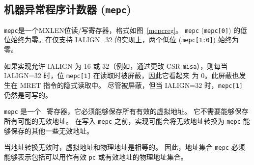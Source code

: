\subsection{机器异常程序计数器 ({\tt mepc})}

\iffalse
{\tt mepc} is an MXLEN-bit read/write register formatted as shown in
Figure~\ref{mepcreg}.  The low bit of {\tt mepc} ({\tt mepc[0]}) is
always zero.  On implementations that support only IALIGN=32, the two low bits
({\tt mepc[1:0]}) are always zero.

If an implementation allows IALIGN to be either 16 or 32 (by
changing CSR {\tt misa}, for example), then, whenever IALIGN=32, bit
{\tt mepc[1]} is masked on reads so that it appears to be 0.  This
masking occurs also for the implicit read by the MRET instruction.
Though masked, {\tt mepc[1]} remains writable when IALIGN=32.

{\tt mepc} is a \warl\ register that must be able to hold all valid
virtual addresses.  It need not be capable of holding all possible invalid
addresses.
Prior to writing {\tt mepc}, implementations may convert an invalid address
into some other invalid address that {\tt mepc} is capable of holding.
\fi

{\tt mepc}是一个MXLEN位读/写寄存器，格式如图~\ref{mepcreg}。 {\tt mepc} ({\tt mepc[0]}) 的低位始终为零。在仅支持 IALIGN=32 的实现上，两个低位 ({\tt mepc[1:0]}) 始终为零。

如果实现允许 IALIGN 为 16 或 32（例如，通过更改 CSR {\tt misa}），则每当 IALIGN=32 时，位 {\tt mepc[1]} 在读取时被屏蔽，因此它看起来 为 0。此屏蔽也发生在 MRET 指令的隐式读取中。 尽管被屏蔽，但当 IALIGN=32 时，{\tt mepc[1]} 仍然是可写的。

{\tt mepc} 是一个 \warl\ 寄存器，它必须能够保存所有有效的虚拟地址。 它不需要能够保存所有可能的无效地址。 在写入 {\tt mepc} 之前，实现可能会将无效地址转换为 {\tt mepc} 能够保存的其他一些无效地址。

\iffalse
\begin{commentary}
When address translation is not in effect, virtual addresses and physical
addresses are equal.
Hence, the set of addresses {\tt mepc} must be able to represent includes the
set of physical addresses that can be used as a valid {\tt pc} or effective
address.
\end{commentary}
\fi
\begin{commentary}
当地址转换无效时，虚拟地址和物理地址是相等的。 因此，地址集合 {\tt mepc} 必须能够表示包括可以用作有效 {\tt pc} 或有效地址的物理地址集合。
\end{commentary}


